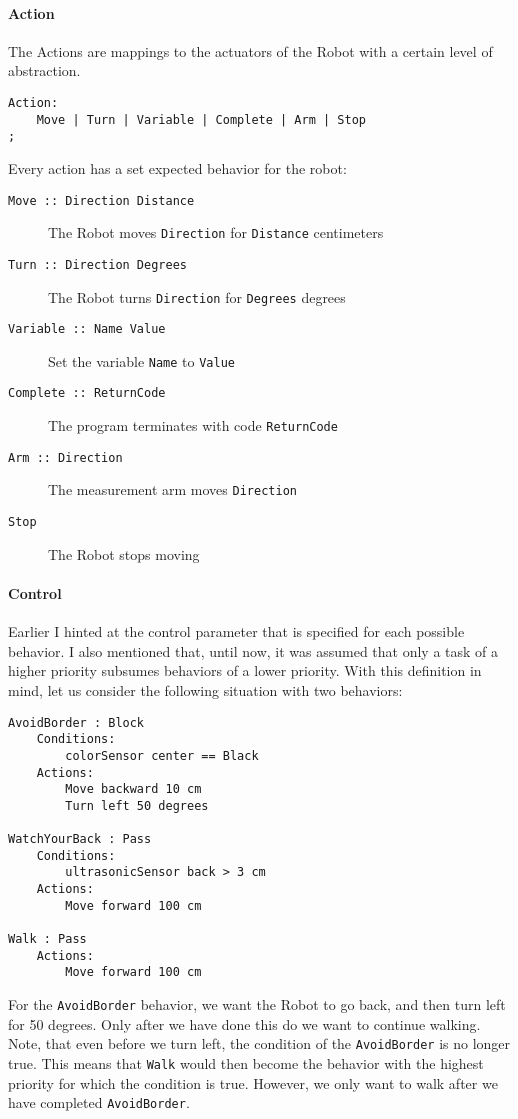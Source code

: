 \documentclass{scrartcl}
\begin{document}
\paragraph{Action}
The Actions are mappings to the actuators of the Robot with a certain level of abstraction.
\begin{verbatim}
Action:
	Move | Turn | Variable | Complete | Arm | Stop
;
\end{verbatim}
Every action has a set expected behavior for the robot:
\begin{description}
	\item[\texttt{Move :: Direction Distance}] The Robot moves \texttt{Direction} for \texttt{Distance} centimeters
	\item[\texttt{Turn :: Direction Degrees}] The Robot turns \texttt{Direction} for \texttt{Degrees} degrees
	\item[\texttt{Variable :: Name Value}] Set the variable \texttt{Name} to \texttt{Value}
	\item[\texttt{Complete :: ReturnCode}] The program terminates with code \texttt{ReturnCode}
	\item[\texttt{Arm :: Direction}] The measurement arm moves \texttt{Direction}
	\item[\texttt{Stop}] The Robot stops moving
\end{description}

\paragraph{Control}
Earlier I hinted at the control parameter that is specified for each possible behavior.
I also mentioned that, until now, it was assumed that only a task of a higher priority subsumes behaviors of a lower priority.
With this definition in mind, let us consider the following situation with two behaviors:
\begin{verbatim}
AvoidBorder : Block
	Conditions:
		colorSensor center == Black
	Actions:
		Move backward 10 cm
		Turn left 50 degrees

WatchYourBack : Pass
	Conditions:
		ultrasonicSensor back > 3 cm
	Actions:
		Move forward 100 cm

Walk : Pass
	Actions:
		Move forward 100 cm
\end{verbatim}

For the \texttt{AvoidBorder} behavior, we want the Robot to go back, and then turn left for 50 degrees.
Only after we have done this do we want to continue walking.
Note, that even before we turn left, the condition of the \texttt{AvoidBorder} is no longer true.
This means that \texttt{Walk} would then become the behavior with the highest priority for which the condition is true.
However, we only want to walk after we have completed \texttt{AvoidBorder}.
\end{document}

